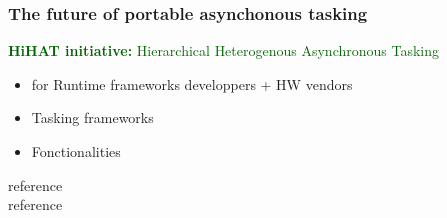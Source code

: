 \begin{frame}
  \frametitle{The future of portable asynchonous tasking}

  {\large \textcolor{darkgreen}{{\bf HiHAT initiative:} Hierarchical Heterogenous Asynchronous Tasking}}

  \begin{itemize}
  \item for Runtime frameworks developpers + HW vendors
  \item<1> Tasking frameworks
  \item<2> Fonctionalities
  \end{itemize}
  

  {\small
    reference \\
    reference 
  }

\end{frame}